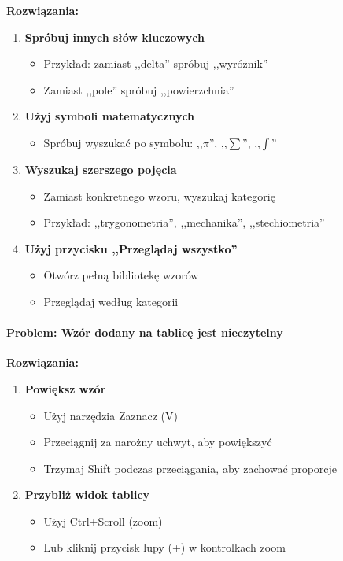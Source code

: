 \documentclass[12pt,a4paper]{article}
\begin{document}
\textbf{Rozwiązania:}

\begin{enumerate}
    \item \textbf{Spróbuj innych słów kluczowych}
    \begin{itemize}
        \item Przykład: zamiast ,,delta'' spróbuj ,,wyróżnik''
        \item Zamiast ,,pole'' spróbuj ,,powierzchnia''
    \end{itemize}
    
    \item \textbf{Użyj symboli matematycznych}
    \begin{itemize}
        \item Spróbuj wyszukać po symbolu: ,,$\pi$'', ,,$\sum$'', ,,$\int$''
    \end{itemize}
    
    \item \textbf{Wyszukaj szerszego pojęcia}
    \begin{itemize}
        \item Zamiast konkretnego wzoru, wyszukaj kategorię
        \item Przykład: ,,trygonometria'', ,,mechanika'', ,,stechiometria''
    \end{itemize}
    
    \item \textbf{Użyj przycisku ,,Przeglądaj wszystko''}
    \begin{itemize}
        \item Otwórz pełną bibliotekę wzorów
        \item Przeglądaj według kategorii
    \end{itemize}
\end{enumerate}

\paragraph{Problem: Wzór dodany na tablicę jest nieczytelny}

\textbf{Rozwiązania:}

\begin{enumerate}
    \item \textbf{Powiększ wzór}
    \begin{itemize}
        \item Użyj narzędzia Zaznacz (V)
        \item Przeciągnij za narożny uchwyt, aby powiększyć
        \item Trzymaj Shift podczas przeciągania, aby zachować proporcje
    \end{itemize}
    
    \item \textbf{Przybliż widok tablicy}
    \begin{itemize}
        \item Użyj Ctrl+Scroll (zoom)
        \item Lub kliknij przycisk lupy (+) w kontrolkach zoom
    \end{itemize}
\end{enumerate}
\end{document}
